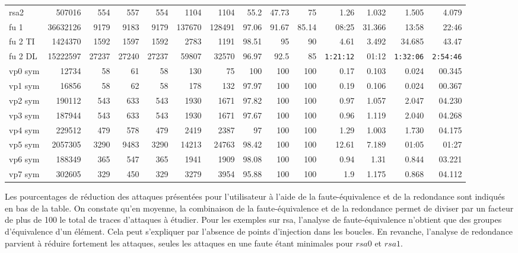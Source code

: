 \begin{table}[p]
\begin{center}
\begin{tabular}{l|r|r|r|r|r|r|r|r|r|r|r|r|r}
                    rsa2 & 507016 & 554 & 557 & 554 & 1104 & 1104 & 55.2 & 47.73 & 75 & 1.26 & 1.032 & 1.505 & 4.079 \\
                    fu 1 & 36632126 & 9179 & 9183 & 9179 & 137670 & 128491 & 97.06 & 91.67 & 85.14 & 08:25 & 31.366 & 13:58 & 22:46 \\
                    fu 2 TI & 1424370 & 1592 & 1597 & 1592 & 2783 & 1191 & 98.51 & 95 & 90 & 4.61 & 3.492 & 34.685 & 43.47 \\
                    fu 2 DL & 15222597 & 27237 & 27240 & 27237 & 59807 & 32570 & 96.97 & 92.5 & 85 & \texttt{1:21:12} & 01:12 & \texttt{1:32:06} & \texttt{2:54:46} \\
                    vp0 sym & 12734 & 58 & 61 & 58 & 130 & 75 & 100 & 100 & 100 & 0.17 & 0.103 & 0.024 & 00.345 \\
                    vp1 sym & 16856 & 58 & 62 & 58 & 178 & 132 & 97.97 & 100 & 100 & 0.19 & 0.106 & 0.024 & 00.367 \\
                    vp2 sym & 190112 & 543 & 633 & 543 & 1930 & 1671 & 97.82 & 100 & 100 & 0.97 & 1.057 & 2.047 & 04.230 \\
                    vp3 sym & 187944 & 543 & 633 & 543 & 1930 & 1671 & 97.67 & 100 & 100 & 0.96 & 1.119 & 2.040 & 04.268 \\
                    vp4 sym & 229512 & 479 & 578 & 479 & 2419 & 2387 & 97 & 100 & 100 & 1.29 & 1.003 & 1.730 & 04.175 \\
                    vp5 sym & 2057305 & 3290 & 9483 & 3290 & 14213 & 24763 & 98.42 & 100 & 100 & 12.61 & 7.189 & 01:05 & 01:27 \\
                    vp6 sym & 188349 & 365 & 547 & 365 & 1941 & 1909 & 98.08 & 100 & 100 & 0.94 & 1.31 & 0.844 & 03.221 \\
                    vp7 sym & 302605 & 329 & 450 & 329 & 3279 & 3954 & 95.88 & 100 & 100 & 1.9 & 1.175 & 0.868 & 04.112
                    \end{tabular}
                    \end{center}
                \end{table} 

                Les pourcentages de réduction des attaques présentées pour l'utilisateur à l'aide de la faute-équivalence et de la redondance sont indiqués en bas de la table.
                On constate qu'en moyenne, la combinaison de la faute-équivalence et de la redondance permet de diviser par un facteur de plus de 100 le total de traces d'attaques à étudier.
                Pour les exemples sur \gls{rsa}, l'analyse de faute-équivalence n'obtient que des groupes d'équivalence d'un élément. Cela peut s'expliquer par l'absence de points d'injection dans les boucles. En revanche, l'analyse de redondance parvient à réduire fortement les attaques, seules les attaques en une faute étant minimales pour $rsa0$ et $rsa1$. 
                

